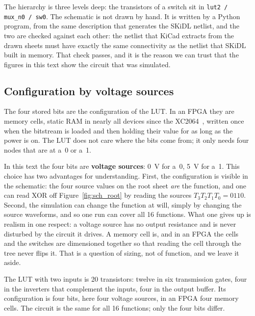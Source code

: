 \documentclass[11pt,a4paper]{article}
\begin{document}
The hierarchy is three levels deep: the transistors of a switch sit in
\texttt{lut2 / mux\_n0 / sw0}. The schematic is not drawn by hand. It is
written by a Python program, from the same description that generates
the SKiDL netlist, and the two are checked against each other: the
netlist that KiCad extracts from the drawn sheets must have exactly
the same connectivity as the netlist that SKiDL built in memory. That
check passes, and it is the reason we can trust that the figures in
this text show the circuit that was simulated.

\subsection{Configuration by voltage sources}

The four stored bits are the configuration of the LUT. In an FPGA they
are memory cells, static RAM in nearly all devices since the
XC2064~\cite{Carter1986}, written once when the bitstream is loaded and
then holding their value for as long as the power is on. The LUT does
not care where the bits come from; it only needs four nodes that are
at a~0 or a~1.

In this text the four bits are \textbf{voltage sources}: \SI{0}{V} for
a~0, \SI{5}{V} for a~1. This choice has two advantages for
understanding. First, the configuration is visible in the schematic:
the four source values on the root sheet \emph{are} the function, and
one can read XOR off Figure~\ref{fig:sch_root} by reading the sources
$T_3T_2T_1T_0=0110$. Second, the simulation can change the function at
will, simply by changing the source waveforms, and so one run can
cover all 16 functions. What one gives up is realism in one respect:
a voltage source has no output resistance and is never disturbed by
the circuit it drives. A memory cell is, and in an FPGA the cells and
the switches are dimensioned together so that reading the cell through
the tree never flips it. That is a question of sizing, not of
function, and we leave it aside.

\begin{merke}
The LUT with two inputs is 20 transistors: twelve in six transmission
gates, four in the inverters that complement the inputs, four in the
output buffer. Its configuration is four bits, here four voltage
sources, in an FPGA four memory cells. The circuit is the same for all
16 functions; only the four bits differ.
\end{merke}

\end{document}
